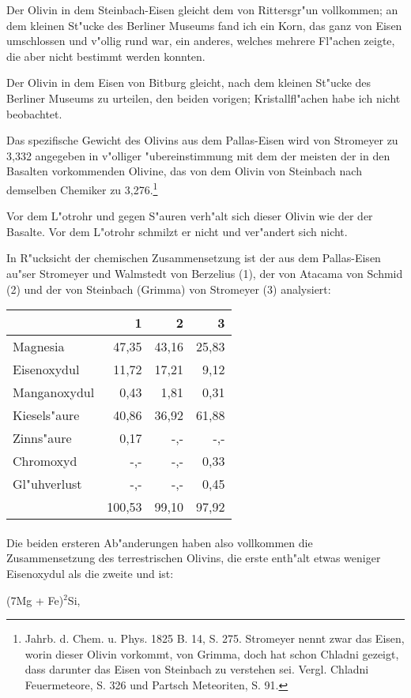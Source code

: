 \documentclass[a4paper, 11pt, oneside, german]{article}
\begin{document}
Der Olivin in dem Steinbach-Eisen gleicht dem von Rittersgr"un vollkommen; an dem kleinen St"ucke des Berliner Museums fand ich ein Korn, das ganz von Eisen umschlossen und v"ollig rund war, ein anderes, welches mehrere Fl"achen zeigte, die aber nicht bestimmt werden konnten.

Der Olivin in dem Eisen von Bitburg gleicht, nach dem kleinen St"ucke des Berliner Museums zu urteilen, den beiden vorigen; Kristallfl"achen habe ich nicht beobachtet.

Das spezifische Gewicht des Olivins aus dem Pallas-Eisen wird von Stromeyer zu 3,332 angegeben in v"olliger "ubereinstimmung mit dem der meisten der in den Basalten vorkommenden Olivine, das von dem Olivin von Steinbach nach demselben Chemiker zu 3,276.\footnote{Jahrb. d. Chem. u. Phys. 1825 B. 14, S. 275. Stromeyer nennt zwar das Eisen, worin dieser Olivin vorkommt, von Grimma, doch hat schon Chladni gezeigt, dass darunter das Eisen von Steinbach zu verstehen sei. Vergl. Chladni Feuermeteore, S. 326 und Partsch Meteoriten, S. 91.}

Vor dem L"otrohr und gegen S"auren verh"alt sich dieser Olivin wie der der Basalte. Vor dem L"otrohr schmilzt er nicht und ver"andert sich nicht.

In R"ucksicht der chemischen Zusammensetzung ist der aus dem Pallas-Eisen au"ser Stromeyer und Walmstedt von Berzelius (1), der von Atacama von Schmid (2) und der von Steinbach (Grimma) von Stromeyer (3) analysiert:
\begin{center}
\begin{tabular}{ |l|r|r|r| }
    \hline
     & 1 & 2 & 3\\
    \hline\hline
    Magnesia & 47,35 & 43,16 & 25,83\\\hline
    Eisenoxydul & 11,72 & 17,21 & 9,12\\\hline
    Manganoxydul & 0,43 & 1,81 & 0,31\\\hline
    Kiesels"aure & 40,86 & 36,92 & 61,88\\\hline
    Zinns"aure & 0,17 & -,- & -,-\\\hline
    Chromoxyd & -,- & -,- & 0,33\\\hline
    Gl"uhverlust & -,- & -,- & 0,45\\\hline
     &100,53 & 99,10 & 97,92\\
    \hline
\end{tabular}
\end{center}
\paragraph{}
Die beiden ersteren Ab"anderungen haben also vollkommen die Zusammensetzung des terrestrischen Olivins, die erste enth"alt etwas weniger Eisenoxydul als die zweite und ist:
\begin{center}
(7Mg + Fe)$^{2}$Si,
\end{center}
\end{document}
